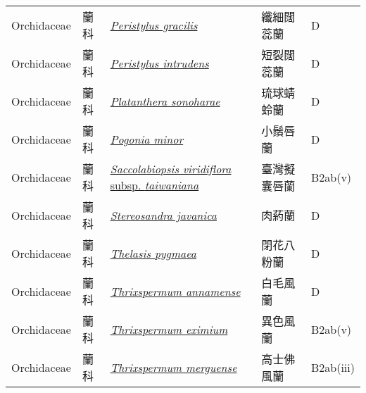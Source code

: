 {\begin{longtable}{p{2.5cm}p{2.5cm}p{4.5cm}p{2.5cm}p{3cm}}
    Orchidaceae & 蘭科 & \href{http://www.theplantlist.org/tpl1.1/search?q=Peristylus+gracilis}{\textit{Peristylus gracilis} } & 纖細闊蕊蘭 & D \index{Peristylus@\textit{Peristylus}!gracilis@\textit{gracilis}}  \index{纖細闊蕊蘭} \\
    Orchidaceae & 蘭科 & \href{http://www.theplantlist.org/tpl1.1/search?q=Peristylus+intrudens}{\textit{Peristylus intrudens} } & 短裂闊蕊蘭 & D \index{Peristylus@\textit{Peristylus}!intrudens@\textit{intrudens}}  \index{短裂闊蕊蘭} \\
    Orchidaceae & 蘭科 & \href{http://www.theplantlist.org/tpl1.1/search?q=Platanthera+sonoharae}{\textit{Platanthera sonoharae} } & 琉球蜻蛉蘭 & D \index{Platanthera@\textit{Platanthera}!sonoharae@\textit{sonoharae}}  \index{琉球蜻蛉蘭} \\
    Orchidaceae & 蘭科 & \href{http://www.theplantlist.org/tpl1.1/search?q=Pogonia+minor}{\textit{Pogonia minor} } & 小鬚唇蘭 & D \index{Pogonia@\textit{Pogonia}!minor@\textit{minor}}  \index{小鬚唇蘭} \\
    Orchidaceae & 蘭科 & \href{http://www.theplantlist.org/tpl1.1/search?q=Saccolabiopsis+viridiflora+subsp.+taiwaniana}{\textit{Saccolabiopsis viridiflora} subsp. \textit{taiwaniana} } & 臺灣擬囊唇蘭 & B2ab(v) \index{Saccolabiopsis@\textit{Saccolabiopsis}!viridiflora@\textit{viridiflora}!subsp. taiwaniana@subsp. \textit{taiwaniana}}  \index{臺灣擬囊唇蘭} \\
    Orchidaceae & 蘭科 & \href{http://www.theplantlist.org/tpl1.1/search?q=Stereosandra+javanica}{\textit{Stereosandra javanica} } & 肉葯蘭 & D \index{Stereosandra@\textit{Stereosandra}!javanica@\textit{javanica}}  \index{肉葯蘭} \\
    Orchidaceae & 蘭科 & \href{http://www.theplantlist.org/tpl1.1/search?q=Thelasis+pygmaea}{\textit{Thelasis pygmaea} } & 閉花八粉蘭 & D \index{Thelasis@\textit{Thelasis}!pygmaea@\textit{pygmaea}}  \index{閉花八粉蘭} \\
    Orchidaceae & 蘭科 & \href{http://www.theplantlist.org/tpl1.1/search?q=Thrixspermum+annamense}{\textit{Thrixspermum annamense} } & 白毛風蘭 & D \index{Thrixspermum@\textit{Thrixspermum}!annamense@\textit{annamense}}  \index{白毛風蘭} \\
    Orchidaceae & 蘭科 & \href{http://www.theplantlist.org/tpl1.1/search?q=Thrixspermum+eximium}{\textit{Thrixspermum eximium} } & 異色風蘭 & B2ab(v) \index{Thrixspermum@\textit{Thrixspermum}!eximium@\textit{eximium}}  \index{異色風蘭} \\
    Orchidaceae & 蘭科 & \href{http://www.theplantlist.org/tpl1.1/search?q=Thrixspermum+merguense}{\textit{Thrixspermum merguense} } & 高士佛風蘭 & B2ab(iii) \index{Thrixspermum@\textit{Thrixspermum}!merguense@\textit{merguense}}  \index{高士佛風蘭} \\

\end{longtable}}
